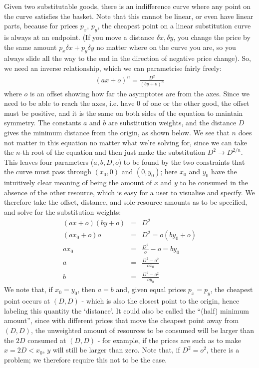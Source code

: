 \documentclass[12pt]{book}
\begin{document}
Given two substitutable goods, there is an indifference curve where
any point on the curve satisfies the basket. Note that this cannot be
linear, or even have linear parts, because for prices $p_x$, $p_y$,
the cheapest point on a linear substitution curve is always at an
endpoint. (If you move a distance $\delta x, \delta y$, you change the
price by the same amount $p_x\delta x + p_y \delta y$ no matter where
on the curve you are, so you always slide all the way to the end in
the direction of negative price change). So, we need an inverse
relationship, which we can parametrise fairly freely:
\begin{eqnarray}
(ax + o)^n = \frac{D^2}{(by +o)^n}
\end{eqnarray}
where $o$ is an offset showing how far the asymptotes are from the
axes. Since we need to be able to reach the axes, i.e. have 0 of one
or the other good, the offset must be positive, and it is the same on
both sides of the equation to maintain symmetry. The constants $a$ and
$b$ are substitution weights, and the distance $D$ gives the minimum
distance from the origin, as shown below. We see that $n$ does not
matter in this equation no matter what we're solving for, since we can take the
$n$-th root of the equation and then just make the substitution
$D^2\to D^{2/n}$. This leaves four parameters ($a,b,D,o$) to be found
by the two constraints that the curve must pass through $(x_0,0)$ and
$(0, y_0)$; here $x_0$ and $y_0$ have the intuitively clear meaning of
being the amount of $x$ and $y$ to be consumed in the absence of the
other resource, which is easy for a user to visualise and specify.
We therefore take the offset, distance, and sole-resource amounts as
to be specified, and solve for the substitution weights:
\begin{eqnarray*}
(ax + o)(by + o) &=& D^2\\
(ax_0 + o)o &=& D^2 = o(by_0 + o)\\
ax_0 &=& \frac{D^2}{o} - o = by_0\\
a &=& \frac{D^2 - o^2}{ox_0}\\
b &=& \frac{D^2 - o^2}{oy_0}
\end{eqnarray*}
We note that, if $x_0=y_0$, then $a=b$ and, given equal prices
$p_x=p_y$, the cheapest point occurs at $(D, D)$ - which is also the
closest point to the origin, hence labeling this quantity the
`distance'. It could also be called the ``(half) minimum amount'', since with
different prices that move the cheapest point away from $(D, D)$, the
unweighted amount of resources to be consumed will be larger than the
$2D$ consumed at $(D, D)$ - for example, if the prices are such as to
make $x=2D<x_0$, $y$ will still be larger than zero. Note that, if
$D^2=o^2$, there is a problem; we therefore require this not to be the
case.
\end{document}
